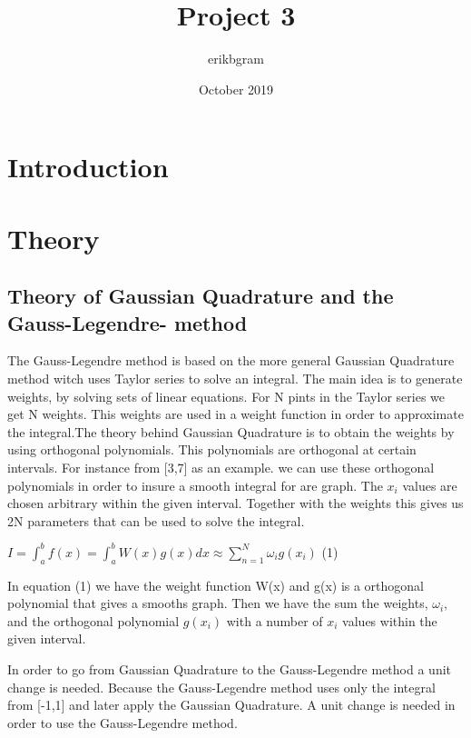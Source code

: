 \documentclass{article}
\title{Project 3}
\author{erikbgram }
\date{October 2019}
\begin{document}
\maketitle

\section{Introduction}
\section{Theory}

\subsection{Theory of Gaussian Quadrature and the Gauss-Legendre- method}

The Gauss-Legendre method is based on the more general Gaussian Quadrature method witch uses Taylor series to solve an integral. The main idea is to generate weights, by solving sets of linear equations. For N pints in the Taylor series we get N weights. This weights are used in a weight function in order to approximate the integral.The theory behind Gaussian Quadrature is to obtain the weights by using orthogonal polynomials. This polynomials are orthogonal at certain intervals. For instance from [3,7] as an example. we can use these orthogonal polynomials in order to insure a smooth integral for are graph. The $x_i$ values are chosen arbitrary within the given interval. Together with the weights this gives us 2N parameters that can be used to solve the integral.      
\newline
\newline

$I = \int_{a}^{b} f(x) = \int_{a}^{b}W(x)g(x)dx \approx  \sum_{n=1}^{N}  \omega_i g(x_i) $ (1) 
\newline
\newline

In equation (1) we have the weight function W(x) and g(x) is a orthogonal polynomial that gives a smooths graph. Then we have the sum the weights, $\omega_i$, and the orthogonal polynomial $g(x_i)$ with a number of $x_i$ values within the given interval. 
\newline
\newline

In order to go from Gaussian Quadrature to the Gauss-Legendre method a unit change is needed. Because the Gauss-Legendre method uses only the integral from [-1,1] and later apply the Gaussian Quadrature. A unit change is needed in order to use the Gauss-Legendre method.  
\newline
\newline
\end{document}
